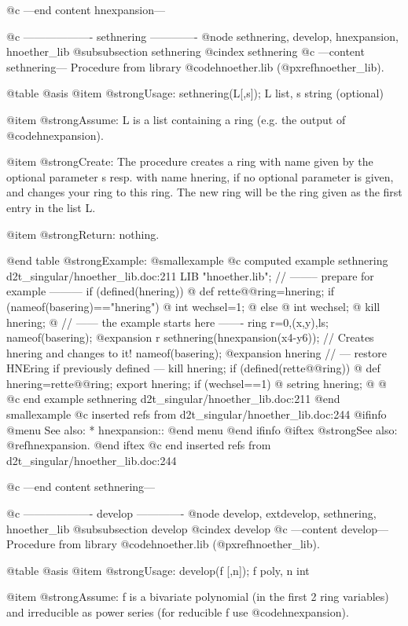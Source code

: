 @c ---end content hnexpansion---

@c ------------------- sethnering -------------
@node sethnering, develop, hnexpansion, hnoether_lib
@subsubsection sethnering
@cindex sethnering
@c ---content sethnering---
Procedure from library @code{hnoether.lib} (@pxref{hnoether_lib}).

@table @asis
@item @strong{Usage:}
sethnering(L[,s]); L list, s string (optional)

@item @strong{Assume:}
L is a list containing a ring (e.g. the output of @code{hnexpansion}).

@item @strong{Create:}
The procedure creates a ring with name given by the optional parameter
s resp. with name hnering, if no optional parameter is given, and
changes your ring to this ring. The new ring will be the ring given
as the first entry in the list L.

@item @strong{Return:}
nothing.

@end table
@strong{Example:}
@smallexample
@c computed example sethnering d2t_singular/hnoether_lib.doc:211 
LIB "hnoether.lib";
// -------- prepare for example ---------
if (defined(hnering))
@{
def rette@@ring=hnering;
if (nameof(basering)=="hnering")
@{
int wechsel=1;
@}
else
@{
int wechsel;
@}
kill hnering;
@}
// ------ the example starts here -------
ring r=0,(x,y),ls;
nameof(basering);
@expansion{} r
sethnering(hnexpansion(x4-y6)); // Creates hnering and changes to it!
nameof(basering);
@expansion{} hnering
// --- restore HNEring if previously defined ---
kill hnering;
if (defined(rette@@ring)) @{
def hnering=rette@@ring;
export hnering;
if (wechsel==1)
@{
setring hnering;
@}
@}
@c end example sethnering d2t_singular/hnoether_lib.doc:211
@end smallexample
@c inserted refs from d2t_singular/hnoether_lib.doc:244
@ifinfo
@menu
See also:
* hnexpansion::
@end menu
@end ifinfo
@iftex
@strong{See also:}
@ref{hnexpansion}.
@end iftex
@c end inserted refs from d2t_singular/hnoether_lib.doc:244

@c ---end content sethnering---

@c ------------------- develop -------------
@node develop, extdevelop, sethnering, hnoether_lib
@subsubsection develop
@cindex develop
@c ---content develop---
Procedure from library @code{hnoether.lib} (@pxref{hnoether_lib}).

@table @asis
@item @strong{Usage:}
develop(f [,n]); f poly, n int

@item @strong{Assume:}
f is a bivariate polynomial (in the first 2 ring variables) and
irreducible as power series (for reducible f use @code{hnexpansion}).

